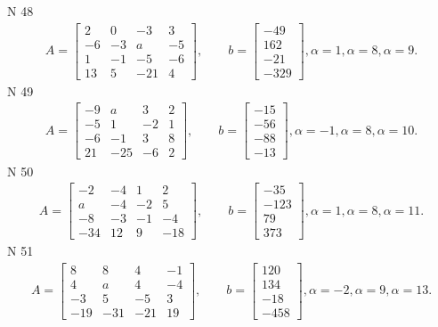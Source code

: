 \documentclass[11pt]{report}
\begin{document}
N 48
\begin{align*}
 A = \left[\begin{matrix}2 & 0 & -3 & 3\\-6 & -3 & a & -5\\1 & -1 & -5 & -6\\13 & 5 & -21 & 4\end{matrix}\right],
    \qquad b = \left[\begin{matrix}-49\\162\\-21\\-329\end{matrix}\right], \alpha = 1, \alpha = 8, \alpha = 9. 
 \end{align*}
N 49
\begin{align*}
 A = \left[\begin{matrix}-9 & a & 3 & 2\\-5 & 1 & -2 & 1\\-6 & -1 & 3 & 8\\21 & -25 & -6 & 2\end{matrix}\right],
    \qquad b = \left[\begin{matrix}-15\\-56\\-88\\-13\end{matrix}\right], \alpha = -1, \alpha = 8, \alpha = 10. 
 \end{align*}
N 50
\begin{align*}
 A = \left[\begin{matrix}-2 & -4 & 1 & 2\\a & -4 & -2 & 5\\-8 & -3 & -1 & -4\\-34 & 12 & 9 & -18\end{matrix}\right],
    \qquad b = \left[\begin{matrix}-35\\-123\\79\\373\end{matrix}\right], \alpha = 1, \alpha = 8, \alpha = 11. 
 \end{align*}
N 51
\begin{align*}
 A = \left[\begin{matrix}8 & 8 & 4 & -1\\4 & a & 4 & -4\\-3 & 5 & -5 & 3\\-19 & -31 & -21 & 19\end{matrix}\right],
    \qquad b = \left[\begin{matrix}120\\134\\-18\\-458\end{matrix}\right], \alpha = -2, \alpha = 9, \alpha = 13. 
 \end{align*}
\end{document}

